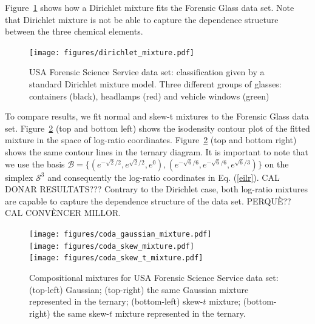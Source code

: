 \documentclass[10pt, a4paper]{article}
\begin{document}
Figure~\ref{fig06fittingdirichlet} shows how a Dirichlet mixture fits
the Forensic Glass data set. Note that Dirichlet mixture is not be able to capture the dependence structure between the three chemical elements. 

\begin{figure}[htbp]
\centering
\texttt{[image: figures/dirichlet\_mixture.pdf]}
\caption{USA Forensic Science Service data set: classification given by a standard Dirichlet mixture model. Three different groups of glasses: containers (black), headlamps (red) and vehicle windows (green)}
\label{fig06fittingdirichlet}
\end{figure}

To compare results, we fit normal and skew-t mixtures to the Forensic Glass data set. Figure~\ref{fig07fittingcodaGaussian} (top and bottom left) shows the isodensity contour plot of the fitted mixture in the space of log-ratio coordinates. Figure~\ref{fig07fittingcodaGaussian} (top and bottom right) shows the same contour lines in the ternary diagram.  It is important to note that we use the basis $\mathcal{B} = \{ (e^{-\sqrt{2}/2}, e^{\sqrt{2}/2}, e^{0}), (e^{-\sqrt{6}/6}, e^{-\sqrt{6}/6}, e^{\sqrt{6}/3}) \}$ on the simplex $\mathcal{S}^3$ and consequently the log-ratio coordinates in Eq. (\ref{eilr}). CAL DONAR RESULTATS??? Contrary to the Dirichlet case, both log-ratio mixtures are capable to capture the dependence structure of the data set. PERQU\`{E}?? CAL CONV\`{E}NCER MILLOR.


\begin{figure}[htbp]
\centering
\texttt{[image: figures/coda\_gaussian\_mixture.pdf]}\\%
\texttt{[image: figures/coda\_skew\_mixture.pdf]}\\%
\texttt{[image: figures/coda\_skew\_t\_mixture.pdf]}%
\caption{Compositional mixtures for USA Forensic Science Service data set: (top-left) Gaussian; (top-right) the same Gaussian mixture represented in the ternary; (bottom-left) skew-$t$ mixture; (bottom-right) the same skew-$t$ mixture represented in the ternary. }
\label{fig07fittingcodaGaussian}
\end{figure}
\end{document}
